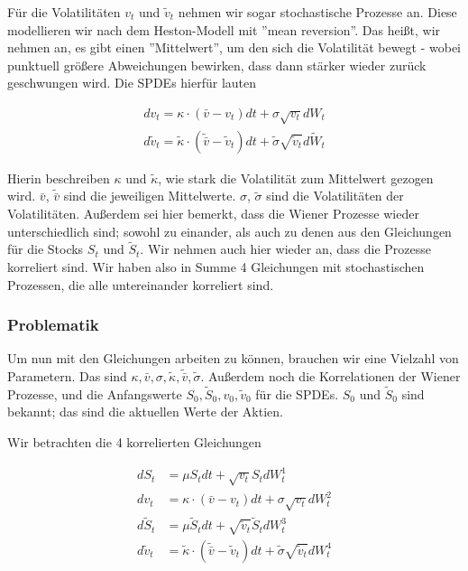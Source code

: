 \documentclass[12pt]{article}
\begin{document}
Für die Volatilitäten $v_t$ und $\tilde{v}_t$ nehmen wir sogar stochastische Prozesse an. Diese modellieren wir nach dem Heston-Modell mit ''mean reversion''. Das heißt, wir nehmen an, es gibt einen ''Mittelwert'', um den sich die Volatilität bewegt - wobei punktuell größere Abweichungen bewirken, dass dann stärker wieder zurück geschwungen wird. Die SPDEs hierfür lauten

\begin{align} \label{SPDEvol}
dv_t = \kappa\cdot(\bar{v}-v_t) dt + \sigma \sqrt{v_t}dW_t \\
d\tilde{v}_t = \tilde{\kappa}\cdot(\tilde{\bar{v}}-\tilde{v}_t) dt + \tilde{\sigma} \sqrt{\tilde{v}_t}d\tilde{W}_t
\end{align}

Hierin beschreiben $\kappa$ und $\tilde{\kappa}$, wie stark die Volatilität zum Mittelwert gezogen wird. $\bar{v}$, $\tilde{\bar{v}}$ sind die jeweiligen Mittelwerte. $\sigma$, $\tilde{\sigma}$ sind die Volatilitäten der Volatilitäten. Außerdem sei hier bemerkt, dass die Wiener Prozesse wieder unterschiedlich sind; sowohl zu einander, als auch zu denen aus den Gleichungen für die Stocks $S_t$ und $\tilde{S}_t$. Wir nehmen auch hier wieder an, dass die Prozesse korreliert sind. Wir haben also in Summe 4 Gleichungen mit stochastischen Prozessen, die alle untereinander korreliert sind.


\subsubsection{Problematik}

Um nun mit den Gleichungen arbeiten zu können, brauchen wir eine Vielzahl von Parametern. Das sind $\kappa, \bar{v}, \sigma, \tilde{\kappa}, \tilde{\bar{v}}, \tilde{\sigma}$. Außerdem noch die Korrelationen der Wiener Prozesse, und die Anfangswerte $S_0, \tilde{S}_0, v_0, \tilde{v}_0$ für die SPDEs. $S_0$ und $\tilde{S}_0$ sind bekannt; das sind die aktuellen Werte der Aktien.

Wir betrachten die 4 korrelierten Gleichungen

\begin{align} \label{SPDE}
dS_t &= \mu S_t dt + \sqrt{v_t} S_t dW^1_t \\
dv_t &= \kappa\cdot(\bar{v}-v_t) dt + \sigma \sqrt{v_t}dW^2_t \\
d\tilde{S}_t &= \mu \tilde{S}_t dt + \sqrt{\tilde{v}_t} \tilde{S}_t dW^3_t \\
d\tilde{v}_t &= \tilde{\kappa}\cdot(\tilde{\bar{v}}-\tilde{v}_t) dt + \tilde{\sigma} \sqrt{\tilde{v}_t}dW^4_t
\end{align}
\end{document}

